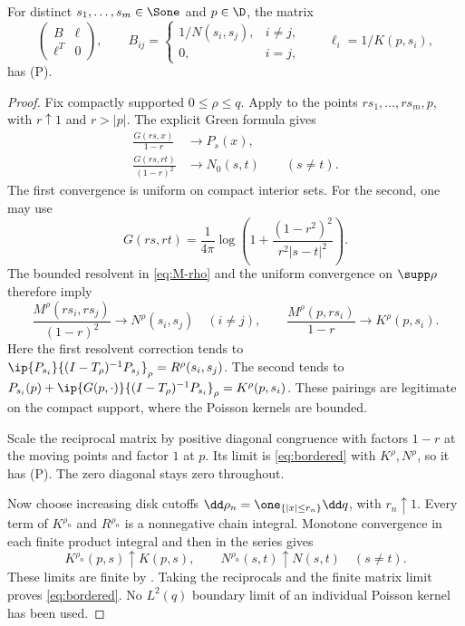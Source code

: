 \begin{lemma}\label{lem:bordered}
For distinct $s_1,\ldots,s_m\in\Sone$ and $p\in\D$, the matrix
\begin{equation}\label{eq:bordered}
\begin{pmatrix}B&\ell\\\ell^T&0\end{pmatrix},
\qquad
B_{ij}=\begin{cases}1/N(s_i,s_j),&i\ne j,\\0,&i=j,\end{cases}
\qquad \ell_i=1/K(p,s_i),
\end{equation}
has \textup{(P)}.
\end{lemma}
\begin{proof}
Fix compactly supported $0\le\rho\le q$. Apply  to the points $r s_1,\ldots,r s_m,p$, with $r\uparrow1$ and $r>|p|$. The explicit Green formula gives
\begin{align}
\frac{G(rs,x)}{1-r}&\longrightarrow P_s(x),\label{eq:radial-one}\\
\frac{G(rs,rt)}{(1-r)^2}&\longrightarrow N_0(s,t)\qquad(s\ne t).\label{eq:radial-two}
\end{align}
The first convergence is uniform on compact interior sets. For the second, one may use
\[
G(rs,rt)=\frac1{4\pi}\log\left(1+\frac{(1-r^2)^2}{r^2|s-t|^2}\right).
\]
The bounded resolvent in \eqref{eq:M-rho} and the uniform convergence on $\supp\rho$ therefore imply
\[
\frac{M^\rho(rs_i,rs_j)}{(1-r)^2}\longrightarrow N^\rho(s_i,s_j)
\quad(i\ne j),\qquad
\frac{M^\rho(p,rs_i)}{1-r}\longrightarrow K^\rho(p,s_i).
\]
Here the first resolvent correction tends to
$\ip{P_{s_i}}{(I-T_\rho)^{-1}P_{s_j}}_\rho=R^\rho(s_i,s_j)$.
The second tends to
$P_{s_i}(p)+\ip{G(p,\cdot)}{(I-T_\rho)^{-1}P_{s_i}}_\rho=K^\rho(p,s_i)$.
These pairings are legitimate on the compact support, where the Poisson kernels are bounded.

Scale the reciprocal matrix by positive diagonal congruence with factors $1-r$ at the moving points and factor $1$ at $p$. Its limit is \eqref{eq:bordered} with $K^\rho,N^\rho$, so it has \textup{(P)}. The zero diagonal stays zero throughout.

Now choose increasing disk cutoffs $\dd\rho_n=\one_{\{|x|\le r_n\}}\dd q$, with $r_n\uparrow1$. Every term of $K^{\rho_n}$ and $R^{\rho_n}$ is a nonnegative chain integral. Monotone convergence in each finite product integral and then in the series gives
\[
K^{\rho_n}(p,s)\uparrow K(p,s),\qquad
N^{\rho_n}(s,t)\uparrow N(s,t)\quad(s\ne t).
\]
These limits are finite by . Taking the reciprocals and the finite matrix limit proves \eqref{eq:bordered}. No $L^2(q)$ boundary limit of an individual Poisson kernel has been used.
\end{proof}

